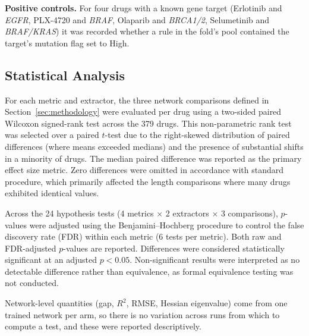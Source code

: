 \textbf{Positive controls.}
For four drugs with a known gene target (Erlotinib and \textit{EGFR}, PLX-4720 and \textit{BRAF}, Olaparib and \textit{BRCA1/2}, Selumetinib and \textit{BRAF/KRAS}) it was recorded whether a rule in the fold's pool contained the target's mutation flag set to High.

\subsection{Statistical Analysis}
\label{sec:stats}

For each metric and extractor, the three network comparisons defined in Section~\ref{sec:methodology} were evaluated per drug using a two-sided paired Wilcoxon signed-rank test across the 379 drugs. This non-parametric rank test was selected over a paired $t$-test due to the right-skewed distribution of paired differences (where means exceeded medians) and the presence of substantial shifts in a minority of drugs. The median paired difference was reported as the primary effect size metric. Zero differences were omitted in accordance with standard procedure, which primarily affected the length comparisons where many drugs exhibited identical values.

Across the 24 hypothesis tests (4 metrics $\times$ 2 extractors $\times$ 3 comparisons), $p$-values were adjusted using the Benjamini--Hochberg procedure to control the false discovery rate (FDR) within each metric (6 tests per metric). Both raw and FDR-adjusted $p$-values are reported. Differences were considered statistically significant at an adjusted $p < 0.05$. Non-significant results were interpreted as no detectable difference rather than equivalence, as formal equivalence testing was not conducted.

Network-level quantities (gap, $R^2$, RMSE, Hessian eigenvalue) come from one trained network per arm, so there is no variation across runs from which to compute a test, and these were reported descriptively.